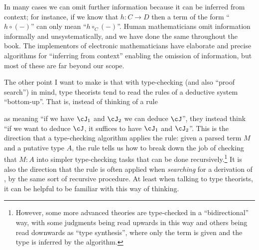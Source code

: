 \documentclass{book}
\newcommand{\atom}{\mathrel{\downarrow}}
\newcommand{\can}{\mathrel{\uparrow}}
\begin{document}
In many cases we can omit further information because it can be inferred from context; for instance, if we know that $h:C\to D$ then a term of the form ``$h\circ (-)$'' can only mean ``$h\circ_C (-)$''.
Human mathematicians omit information informally and unsystematically, and we have done the same throughout the book.
The implementors of electronic mathematicians have elaborate and precise algorithms for ``inferring from context'' enabling the omission of information, but most of these are far beyond our scope.

The other point I want to make is that with type-checking (and also ``proof search'') in mind, type theorists tend to read the rules of a deductive system ``bottom-up''.
That is, instead of thinking of a rule
\begin{mathpar}
\end{mathpar}
as meaning ``if we have $\cJ_1$ and $\cJ_2$ we can deduce $\cJ$'', they instead think ``if we want to deduce $\cJ$, it suffices to have $\cJ_1$ and $\cJ_2$''.
This is the direction that a type-checking algorithm applies the rule: given a parsed term $M$ and a putative type $A$, the rule tells us how to break down the job of checking that $M:A$ into simpler type-checking tasks that can be done recursively.\footnote{However, some more advanced theories are type-checked in a ``bidirectional'' way, with some judgments being read upwards in this way and others being read downwards as ``type synthesis'', where only the term is given and the type is inferred by the algorithm.}
It is also the direction that the rule is often applied when \emph{searching} for a derivation of \cJ, by the same sort of recursive procedure.
At least when talking to type theorists, it can be helpful to be familiar with this way of thinking.
\end{document}
